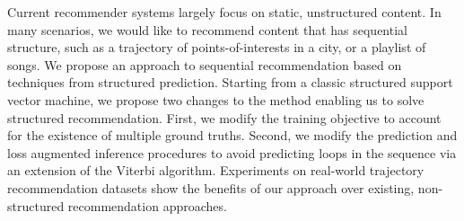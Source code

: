 
Current recommender systems largely focus on static, unstructured content.
In many scenarios, we would like to recommend content that has sequential structure,
such as %
a trajectory of points-of-interests in a city, or a playlist of songs.
We propose an approach to sequential recommendation based
on techniques from structured prediction.
Starting from a classic structured support vector machine,
we propose two changes to the method %
enabling us to solve structured recommendation.
First, we modify the training objective to account for the existence of multiple ground truths.
Second, we modify the prediction and loss augmented inference procedures to avoid predicting loops in the sequence via an extension of the Viterbi algorithm.
Experiments on real-world trajectory recommendation datasets show the benefits of our approach over existing, non-structured recommendation approaches.
